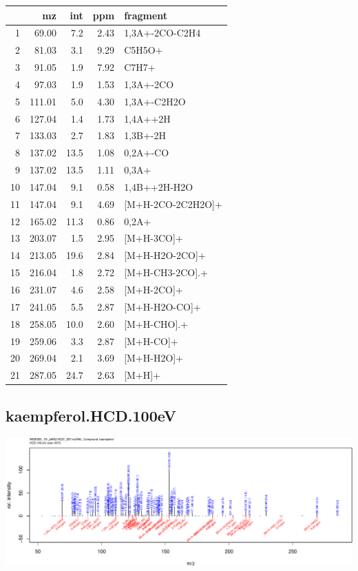 \documentclass[]{article}
\begin{document}
\begin{table}[ht]
\centering
\begin{tabular}{rrrrl}
  \toprule
 & mz & int & ppm & fragment \\ 
  \midrule
1 & 69.00 & 7.2 & 2.43 & 1,3A+-2CO-C2H4 \\ 
  2 & 81.03 & 3.1 & 9.29 & C5H5O+ \\ 
  3 & 91.05 & 1.9 & 7.92 & C7H7+ \\ 
  4 & 97.03 & 1.9 & 1.53 & 1,3A+-2CO \\ 
  5 & 111.01 & 5.0 & 4.30 & 1,3A+-C2H2O \\ 
  6 & 127.04 & 1.4 & 1.73 & 1,4A++2H \\ 
  7 & 133.03 & 2.7 & 1.83 & 1,3B+-2H \\ 
  8 & 137.02 & 13.5 & 1.08 & 0,2A+-CO \\ 
  9 & 137.02 & 13.5 & 1.11 & 0,3A+ \\ 
  10 & 147.04 & 9.1 & 0.58 & 1,4B++2H-H2O \\ 
  11 & 147.04 & 9.1 & 4.69 & [M+H-2CO-2C2H2O]+ \\ 
  12 & 165.02 & 11.3 & 0.86 & 0,2A+ \\ 
  13 & 203.07 & 1.5 & 2.95 & [M+H-3CO]+ \\ 
  14 & 213.05 & 19.6 & 2.84 & [M+H-H2O-2CO]+ \\ 
  15 & 216.04 & 1.8 & 2.72 & [M+H-CH3-2CO].+ \\ 
  16 & 231.07 & 4.6 & 2.58 & [M+H-2CO]+ \\ 
  17 & 241.05 & 5.5 & 2.87 & [M+H-H2O-CO]+ \\ 
  18 & 258.05 & 10.0 & 2.60 & [M+H-CHO].+ \\ 
  19 & 259.06 & 3.3 & 2.87 & [M+H-CO]+ \\ 
  20 & 269.04 & 2.1 & 3.69 & [M+H-H2O]+ \\ 
  21 & 287.05 & 24.7 & 2.63 & [M+H]+ \\ 
   \bottomrule
\end{tabular}
\end{table}

\clearpage\subsection{kaempferol.HCD.100eV}
\includegraphics[width=\textwidth]{WEB350_files/figure-latex/unnamed-chunk-3-27}
\end{document}
